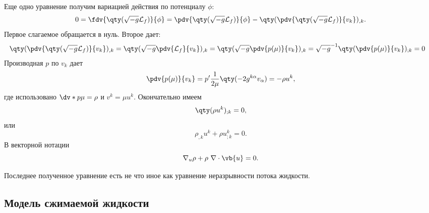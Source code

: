 \documentclass[\docroot/reports/draft/report.tex]{subfiles}
\begin{document}
    Еще одно уравнение получим вариацией действия по потенциалу $\phi$:
    \begin{equation*}
        0 = \fdv{\qty(\sqrt{-g} \mathcal{L}_f)}{\phi} =
            \pdv{\qty(\sqrt{-g} \mathcal{L}_f)}{\phi} -
            \qty(\pdv{\qty(\sqrt{-g} \mathcal{L}_f)}{v_k})_{,k} .
    \end{equation*}
    Первое слагаемое обращается в нуль. Второе дает:
    \begin{equation*}\begin{aligned}
        \qty(\pdv{\qty(\sqrt{-g} \mathcal{L}_f)}{v_k})_{,k} &=
        \qty(\sqrt{-g} \pdv{\mathcal{L}_f}{v_k})_{,k} =
        \qty(\sqrt{-g} \pdv{p(\mu)}{v_k})_{,k} =
        \sqrt{-g}^{-1} \qty(\pdv{p(\mu)}{v_k})_{;k} = 0
    \end{aligned}\end{equation*}
    Производная $p$ по $v_k$ дает
    \begin{equation*}
        \pdv{p(\mu)}{v_k} = p' \frac{1}{2 \mu} \qty(- 2 g^{k\alpha} v_\alpha) = - \rho u^k ,
    \end{equation*}
    где использовано $\dv*{p}{\mu} = \rho$ и $v^k = \mu u^k$. Окончательно имеем
    \begin{equation*}
        \qty(\rho u^k)_{;k} = 0 ,
    \end{equation*}
    или
    \begin{equation*}
        \rho_{,k} u^k + \rho u^k_{;k} = 0 .
    \end{equation*}
    В векторной нотации
    \begin{equation}
        \nabla_u \rho + \rho\ \nabla \cdot \vb{u} = 0 .
    \end{equation}

    Последнее полученное уравнение есть не что иное как уравнение неразрывности потока жидкости.

\subsection{Модель сжимаемой жидкости}
\end{document}
